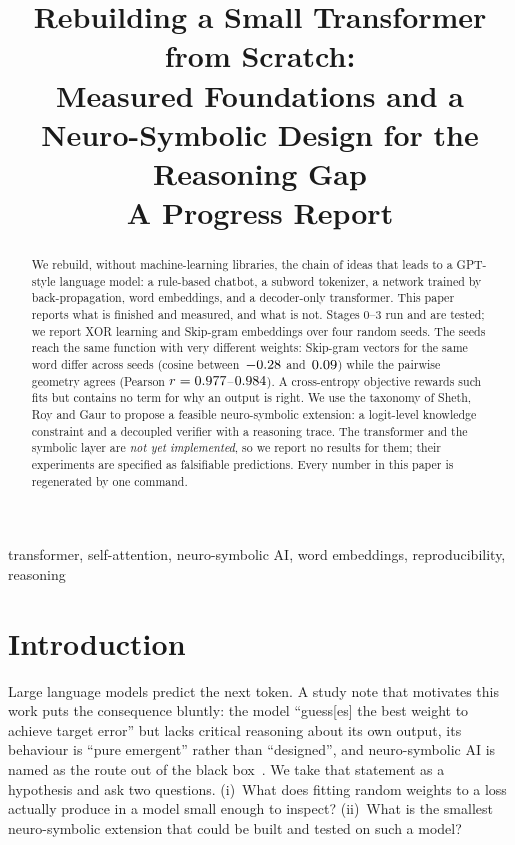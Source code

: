 \documentclass[conference]{IEEEtran}
\begin{document}
\title{Rebuilding a Small Transformer from Scratch:\\
Measured Foundations and a Neuro-Symbolic Design for the Reasoning Gap\\
\large A Progress Report}

\author{
}

\maketitle

\begin{abstract}
We rebuild, without machine-learning libraries, the chain of ideas that leads to a GPT-style language model: a rule-based chatbot, a subword tokenizer, a network trained by back-propagation, word embeddings, and a decoder-only transformer. This paper reports what is finished and measured, and what is not. Stages 0--3 run and are tested; we report XOR learning and Skip-gram embeddings over four random seeds. The seeds reach the same function with very different weights: Skip-gram vectors for the same word differ across seeds (cosine between~$-0.28$ and~$0.09$) while the pairwise geometry agrees (Pearson $r=0.977$--$0.984$). A cross-entropy objective rewards such fits but contains no term for why an output is right. We use the taxonomy of Sheth, Roy and Gaur to propose a feasible neuro-symbolic extension: a logit-level knowledge constraint and a decoupled verifier with a reasoning trace. The transformer and the symbolic layer are \emph{not yet implemented}, so we report no results for them; their experiments are specified as falsifiable predictions. Every number in this paper is regenerated by one command.
\end{abstract}

\begin{IEEEkeywords}
transformer, self-attention, neuro-symbolic AI, word embeddings, reproducibility, reasoning
\end{IEEEkeywords}

\section{Introduction}
Large language models predict the next token. A study note that motivates this work puts the consequence bluntly: the model ``guess[es] the best weight to achieve target error'' but lacks critical reasoning about its own output, its behaviour is ``pure emergent'' rather than ``designed'', and neuro-symbolic AI is named as the route out of the black box~\cite{note}. We take that statement as a hypothesis and ask two questions. (i)~What does fitting random weights to a loss actually produce in a model small enough to inspect? (ii)~What is the smallest neuro-symbolic extension that could be built and tested on such a model?
\end{document}
